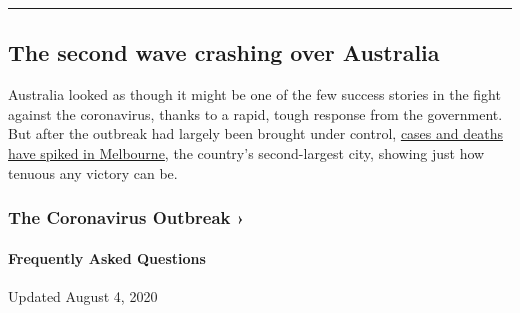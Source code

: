 \begin{center}\rule{0.5\linewidth}{\linethickness}\end{center}

\hypertarget{the-second-wave-crashing-over-australia}{%
\subsection{The second wave crashing over
Australia}\label{the-second-wave-crashing-over-australia}}

Australia looked as though it might be one of the few success stories in
the fight against the coronavirus, thanks to a rapid, tough response
from the government. But after the outbreak had largely been brought
under control,
\href{https://www.nytimes.com/2020/08/04/world/australia/coronavirus-melbourne-lockdown.html}{cases
and deaths have spiked in Melbourne}, the country's second-largest city,
showing just how tenuous any victory can be.

\href{https://www.nytimes.com/news-event/coronavirus?action=click\&pgtype=Article\&state=default\&region=MAIN_CONTENT_3\&context=storylines_faq}{}

\hypertarget{the-coronavirus-outbreak-}{%
\subsubsection{The Coronavirus Outbreak
›}\label{the-coronavirus-outbreak-}}

\hypertarget{frequently-asked-questions}{%
\paragraph{Frequently Asked
Questions}\label{frequently-asked-questions}}

Updated August 4, 2020

